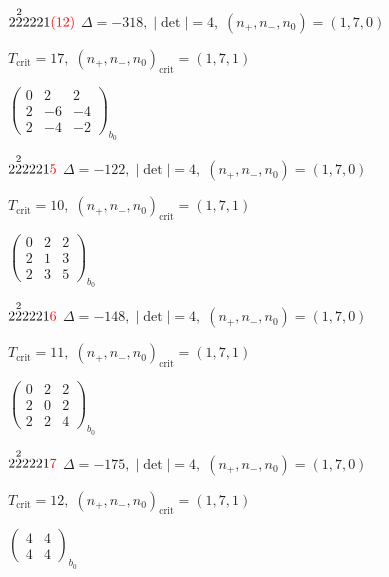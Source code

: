 \documentclass[10pt]{article}
\begin{document}
$2\overset{2}{2}2221\textcolor{red}{(12)}$ \quad $\Delta=-318,\; |\det|=4,\; (n_+,n_-,n_0)=(1,7,0)$

\hspace{1em}$T_{\text{crit}}=17,\; (n_+,n_-,n_0)_{\text{crit}}=(1,7,1)$

\hspace{2em}$\left(\begin{smallmatrix}0 & 2 & 2 \\ 2 & -6 & -4 \\ 2 & -4 & -2\end{smallmatrix}\right)_{\!b_0}$

$2\overset{2}{2}2221\textcolor{red}{5}$ \quad $\Delta=-122,\; |\det|=4,\; (n_+,n_-,n_0)=(1,7,0)$

\hspace{1em}$T_{\text{crit}}=10,\; (n_+,n_-,n_0)_{\text{crit}}=(1,7,1)$

\hspace{2em}$\left(\begin{smallmatrix}0 & 2 & 2 \\ 2 & 1 & 3 \\ 2 & 3 & 5\end{smallmatrix}\right)_{\!b_0}$

$2\overset{2}{2}2221\textcolor{red}{6}$ \quad $\Delta=-148,\; |\det|=4,\; (n_+,n_-,n_0)=(1,7,0)$

\hspace{1em}$T_{\text{crit}}=11,\; (n_+,n_-,n_0)_{\text{crit}}=(1,7,1)$

\hspace{2em}$\left(\begin{smallmatrix}0 & 2 & 2 \\ 2 & 0 & 2 \\ 2 & 2 & 4\end{smallmatrix}\right)_{\!b_0}$

$2\overset{2}{2}2221\textcolor{red}{7}$ \quad $\Delta=-175,\; |\det|=4,\; (n_+,n_-,n_0)=(1,7,0)$

\hspace{1em}$T_{\text{crit}}=12,\; (n_+,n_-,n_0)_{\text{crit}}=(1,7,1)$

\hspace{2em}$\left(\begin{smallmatrix}4 & 4 \\ 4 & 4\end{smallmatrix}\right)_{\!b_0}$

\smallskip
\end{document}
